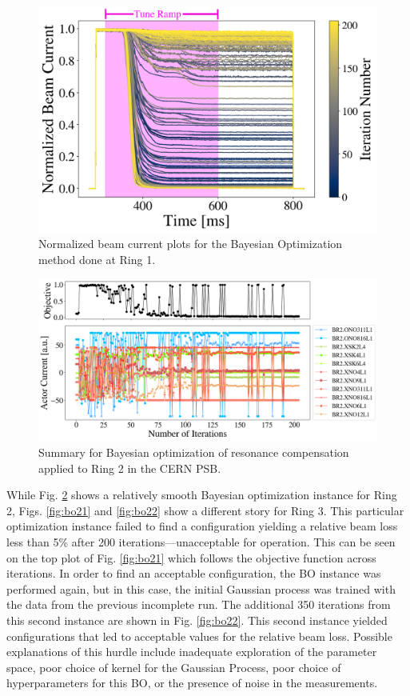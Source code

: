 \begin{figure}[H]
    \centering
    \includegraphics[width=\linewidth]{chapter5/i1_bo_commented.png}
    \caption{Normalized beam current plots for the Bayesian Optimization method done at Ring 1.}
    \label{fig:ibo}
\end{figure}

\begin{figure}[H]
    \centering
    \includegraphics[width=\linewidth]{chapter5/2023_05_02_R2_LHCramp_BayesOpt.png}
    \caption{Summary for Bayesian optimization of resonance compensation applied to Ring 2 in the CERN PSB.}
    \label{fig:bo1}
\end{figure}

While Fig. \ref{fig:bo1} shows a relatively smooth Bayesian optimization instance for Ring 2, Figs. \ref{fig:bo21} and \ref{fig:bo22} show a different story for Ring 3. This particular optimization instance failed to find a configuration yielding a relative beam loss less than 5\% after 200 iterations---unacceptable for operation. This can be seen on the top plot of Fig. \ref{fig:bo21} which follows the objective function across iterations. In order to find an acceptable configuration, the BO instance was performed again, but in this case, the initial Gaussian process was trained with the data from the previous incomplete run. The additional 350 iterations from this second instance are shown in Fig. \ref{fig:bo22}. This second instance yielded configurations that led to acceptable values for the relative beam loss. Possible explanations of this hurdle include inadequate exploration of the parameter space, poor choice of kernel for the Gaussian Process, poor choice of hyperparameters for this BO, or the presence of noise in the measurements.

